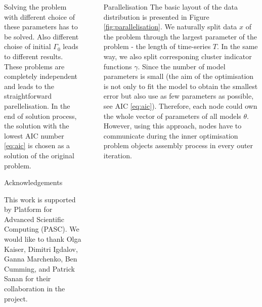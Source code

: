 \documentclass[final,hyperref={pdfpagelabels=false}]{beamer}
\begin{document}
\begin{frame}[t]
\begin{columns}[t]
\begin{column}{.48\textwidth}
\begin{block}{Solving the problem}
with different choice of these parameters has to be solved. Also different choise of initial $\Gamma_0$ leads to different results.
These problems are completely independent and leads to the straightforward parellelisation. In the end of solution process, the solution with the lowest AIC number \eqref{eq:aic}
is chosen as a solution of the original problem. \newline
\end{block}



\begin{block}{Acknowledgements}

\noindent
\par 

This work is supported by Platform for Advanced Scientific Computing (PASC).
We would like to thank Olga Kaiser, Dimitri Igdalov, Ganna Marchenko, Ben Cumming, and Patrick Sanan for their collaboration in the project.

\end{block}


\end{column} %


\begin{column}{.02\textwidth}\end{column} %

 
\begin{column}{.48\textwidth} %



\begin{block}{Parallelisation}
The basic layout of the data distribution is presented in Figure \ref{fig:parallelisation}. We naturally split data $x$ of the problem through the largest parameter of the problem - the length of time-series $T$.
In the same way, we also split corresponing cluster indicator functions $\gamma$. Since the number of model parameters is small (the aim of the optimisation
is not only to fit the model to obtain the smallest error but also use as few parameters as possible, see AIC \eqref{eq:aic}). Therefore, each node could own the whole vector of parameters of all models $\theta$.
However, using this approach, nodes have to communicate during the inner optimisation problem objects assembly process in every outer iteration.


\end{block}
\end{column}
\end{columns}
\end{frame}
\end{document}
